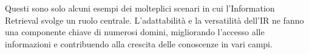 Questi sono solo alcuni esempi dei molteplici scenari in cui l'Information Retrieval svolge un ruolo centrale. L'adattabilità e la versatilità dell'IR ne fanno una componente chiave di numerosi domini, migliorando l'accesso alle informazioni e contribuendo alla crescita delle conoscenze in vari campi.